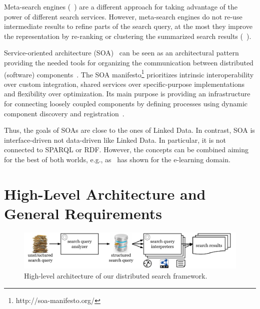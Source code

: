 Meta-search engines (\eg~\cite{liebel2004harvester,gulli2005building}) are a different approach for taking advantage of the power of different search services.
However, meta-search engines do not re-use intermediate results to refine parts of the search query, at the most they improve the representation by re-ranking or clustering the summarized search results (\eg~\cite{carpineto10metasearchclustering}).

Service-oriented architecture (SOA)~\cite{Gartner96,OASIS06} can be seen as an architectural pattern providing the needed tools for organizing the communication between distributed (software) components~\cite{bell2009soa}.
The SOA manifesto\footnote{http://soa-manifesto.org/} prioritizes intrinsic interoperability over custom integration, shared services over specific-purpose implementations and flexibility over optimization. 
Its main purpose is providing an infrastructure for connecting loosely coupled components by defining processes using dynamic component discovery and registration~\cite{erl2008soa}.

Thus, the goals of SOAs are close to the ones of Linked Data.
In contrast, SOA is interface-driven not data-driven like Linked Data. 
In particular, it is not connected to SPARQL or RDF.
However, the concepts can be combined aiming for the best of both worlds, e.g., as~\cite{yu2011linked} has shown for the e-learning domain.


\section{High-Level Architecture and General Requirements}\label{chafedsearch:sec:architecture}
\begin{figure}[t]
\centering
\includegraphics[width=\textwidth]{chapter_four/SEMANTiCS_architecture/highlevelarchitecture2}
\caption{High-level architecture of our distributed search framework.}
\label{fig:highlevelarchitecture}
\end{figure}


